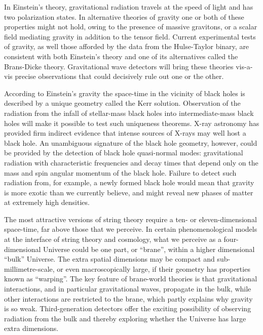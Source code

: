 In Einstein's theory, gravitational radiation travels at the speed of light and has two polarization states. 
In alternative theories of gravity one or both of these properties might not hold, owing 
to the presence of massive gravitons, or a scalar field mediating gravity in addition to the tensor field. 
Current experimental tests of gravity, as well those afforded by the data from the
Hulse-Taylor binary, are consistent with both Einstein's theory and one of its alternatives called the Brans-Dicke theory.
Gravitational wave detectors will bring these theories vis-a-vis precise observations that could decisively rule out one or the other.

According to Einstein's gravity the space-time in the vicinity of black holes is described by a unique geometry called the Kerr solution. 
Observation of the radiation from the infall of stellar-mass black holes into intermediate-mass black holes will make it possible to test such uniqueness theorems. 
X-ray astronomy has provided firm indirect evidence that intense sources of X-rays may well host a black hole. 
An unambiguous signature of the black hole geometry, however, could be provided by the detection of black hole quasi-normal modes:
gravitational radiation with characteristic frequencies and decay times that depend only on the mass and spin angular momentum of the black hole.
Failure to detect such radiation from, for example, a newly formed black hole would mean that gravity is more exotic than we currently believe,
and might reveal new phases of matter at extremely high densities.

The most attractive versions of string theory require a ten- or eleven-dimensional space-time, far above those that we perceive.
In certain phenomenological models at the interface of string theory and cosmology, what we perceive as a four-dimensional Universe could be one part, or ``brane'', within a higher dimensional ``bulk'' Universe. 
The extra spatial dimensions may be compact and sub-millimetre-scale, 
or even macroscopically large, if their geometry has  properties known as ``warping''. 
The key feature of brane-world theories is that gravitational interactions, and in particular
gravitational waves, propagate in the bulk, while other interactions are restricted to the brane, which partly explains why gravity is so weak. 
Third-generation detectors offer the exciting possibility of observing radiation from the bulk and 
thereby exploring whether the Universe has large extra dimensions.



